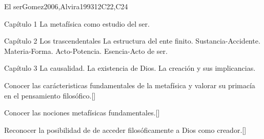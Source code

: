 \begin{syllabus}
\begin{unit}{}{El ser}{Gomez2006,Alvira1993}{12}{C22,C24}
\begin{topics}
	\item Capítulo 1
		\subitem La metafísica como estudio del ser.
	\item Capítulo 2
		\subitem Los trascendentales
		\subitem La estructura del ente finito. 
			\subsubitem Sustancia-Accidente.
			\subsubitem Materia-Forma.
			\subsubitem Acto-Potencia.
			\subsubitem Esencia-Acto de ser.
	\item Capítulo 3
		\subitem La causalidad.
		\subitem La existencia de Dios.
		\subitem La creación y sus implicancias.
\end{topics}

\begin{learningoutcomes}
	\item Conocer las carácteristicas fundamentales de la metafísica y valorar su primacía en el pensamiento filosófico.[\Familiarity]
	\item Conocer las nociones metafísicas fundamentales.[\Familiarity]
	\item Reconocer la posibilidad de de acceder filosóficamente a Dios como creador.[\Familiarity]
\end{learningoutcomes}
\end{unit}

\begin{coursebibliography}
\end{coursebibliography}

\end{syllabus}
